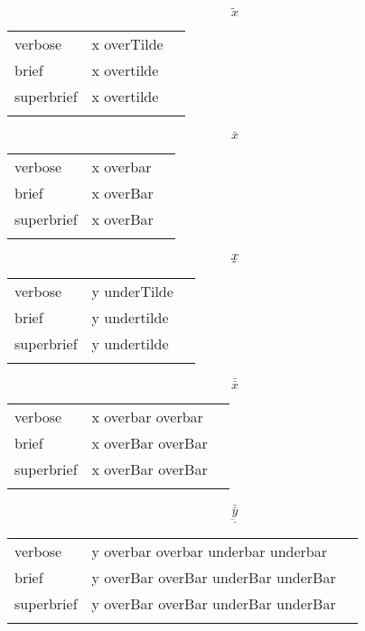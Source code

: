 \R
\E \[\tilde{x}\]
\begin{longtable}[c]{@{}lll@{}}
\toprule\addlinespace
verbose & x overTilde &

\\\addlinespace
brief & x overtilde &

\\\addlinespace
superbrief & x overtilde &

\\\addlinespace
\bottomrule
\end{longtable}


\E \[\bar{x}\]
\begin{longtable}[c]{@{}lll@{}}
\toprule\addlinespace
verbose & x overbar &

\\\addlinespace
brief & x overBar &

\\\addlinespace
superbrief & x overBar &

\\\addlinespace
\bottomrule
\end{longtable}


\E \[\underaccent{\tilde}{x}\]
\begin{longtable}[c]{@{}lll@{}}
\toprule\addlinespace
verbose & y underTilde &

\\\addlinespace
brief & y undertilde &

\\\addlinespace
superbrief & y undertilde &

\\\addlinespace
\bottomrule
\end{longtable}


\R
\E \[\bar{\bar{x}}\]
\begin{longtable}[c]{@{}lll@{}}
\toprule\addlinespace
verbose & x overbar overbar &

\\\addlinespace
brief & x overBar overBar &

\\\addlinespace
superbrief & x overBar overBar &

\\\addlinespace
\bottomrule
\end{longtable}


\E \[\bar{\underline{\bar{\underbar{y}}}}\]
\begin{longtable}[c]{@{}lll@{}}
\toprule\addlinespace
verbose & y overbar overbar underbar underbar &

\\\addlinespace
brief & y overBar overBar underBar underBar &

\\\addlinespace
superbrief & y overBar overBar underBar underBar &

\\\addlinespace
\bottomrule
\end{longtable}


